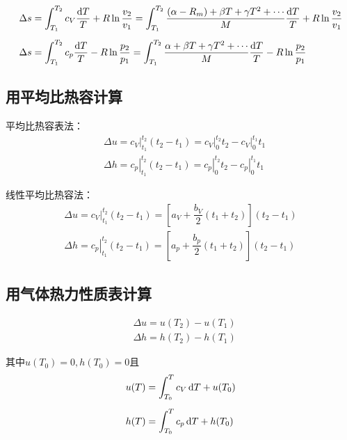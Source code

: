 \begin{align}
	&\Delta s = \int_{T_1}^{T_2} c_V \dfrac{{\rm{d}} T}{T} + R \ln\dfrac{v_2}{v_1} = \int_{T_1}^{T_2} \dfrac{\left(\alpha - R_m\right) + \beta T + \gamma T^2 + \cdots}{M} \dfrac{{\rm{d}} T}{T}+ R \ln \dfrac{v_2}{v_1}\\[0.5em]
	&\Delta s = \int_{T_1}^{T_2} c_p \dfrac{{\rm{d}} T}{T} - R \ln\dfrac{p_2}{p_1} =  \int_{T_1}^{T_2} \dfrac{\alpha + \beta T + \gamma T^2 + \cdots}{M} \dfrac{{\rm{d}} T}{T} - R \ln \dfrac{p_2}{p_1}
\end{align}

\newpage

\subsection{用平均比热容计算}
平均比热容表法：
\begin{align}
	&\Delta u = \left. c_V \right|_{t_1}^{t_2} (t_2 - t_1) =  \left. c_V \right|_{0}^{t_2}t_2 -  \left. c_V \right|_{0}^{t_1}t_1 \\[0.5em]
	&\Delta h = \left. c_p \right|_{t_1}^{t_2} (t_2 - t_1) =  \left. c_p \right|_{0}^{t_2}t_2 -  \left. c_p \right|_{0}^{t_1}t_1 
\end{align}
\vspace*{-3em}

线性平均比热容法：
\begin{align}
	\Delta u = \left. c_V \right|_{t_1}^{t_2} (t_2 - t_1) = \left[a_V + \dfrac{b_V}{2}(t_1 + t_2)\right](t_2 - t_1) \\[0.5em]
	\Delta h = \left. c_p \right|_{t_1}^{t_2} (t_2 - t_1) =  \left[a_p + \dfrac{b_p}{2}(t_1 + t_2)\right](t_2 - t_1)
\end{align}
\vspace*{2em}

\subsection{用气体热力性质表计算}
\vspace*{-3em}
\begin{align}
	&\Delta u = u(T_2) - u(T_1)\\
	&\Delta h = h(T_2) - h(T_1)
\end{align}
\vspace*{-3em}

\noindent 其中$u(T_0) = 0 ,h(T_0) = 0$且
\begin{align}
	&u(T) = \int_{T_0}^{T} c_V \, {\rm{d}} T + u(T_0)\\[0.5em]
	&h(T) = \int_{T_0}^{T} c_p \, {\rm{d}} T + h(T_0)
\end{align}
\vspace*{-3em}

